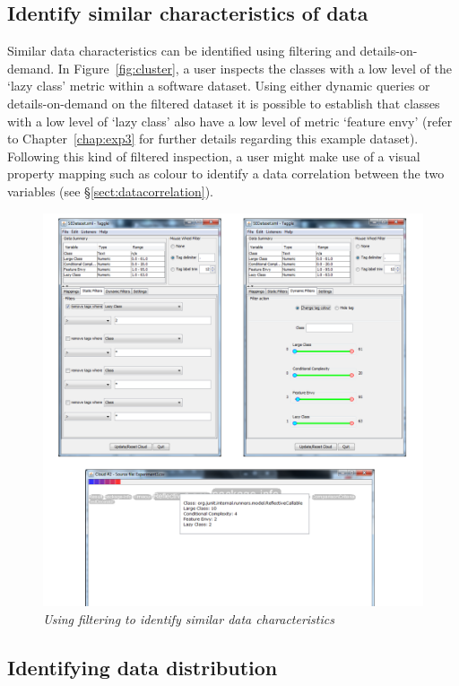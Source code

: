\subsection{Identify similar characteristics of data}

Similar data characteristics can be identified using filtering and details-on-demand. In Figure~\vref{fig:cluster}, a user inspects the classes with a low level of the `lazy class' metric within a software dataset. Using either dynamic queries or details-on-demand on the filtered dataset it is possible to establish that classes with a low level of `lazy class' also have a low level of metric `feature envy' (refer to Chapter~\ref{chap:exp3} for further details regarding this example dataset). Following this kind of filtered inspection, a user might make use of a visual property mapping such as colour to identify a data correlation between the two variables (see \S\ref{sect:datacorrelation}).

\begin{figure}[!htb]
  	\centering
   	\includegraphics[scale=0.30]{cluster1.png}
  	\caption{\textit{Using filtering to identify similar data characteristics}}
	\label{fig:cluster}
\end{figure}

\subsection{Identifying data distribution}

